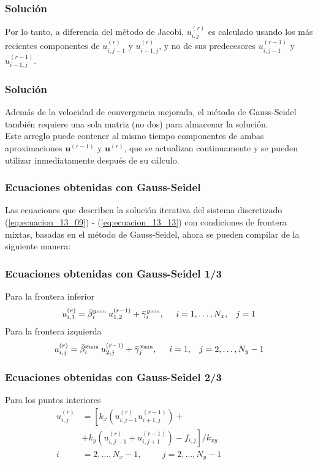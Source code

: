 \documentclass[12pt]{beamer}
\begin{document}
\begin{frame}
\frametitle{Solución}
Por lo tanto, a diferencia del método de Jacobi, $u_{i,j}^{(r)}$ es calculado usando los más recientes componentes de $u_{i,j-1}^{(r)}$ y $u_{i-1, j}^{(r)}$, y no de sus predecesores $u_{i,j-1}^{(r-1)}$ y $u_{i-1, j}^{(r-1)}$.
\end{frame}
\begin{frame}
\frametitle{Solución}
Además de la velocidad de convergencia mejorada, el método de Gauss-Seidel también requiere una sola matriz (no dos) para almacenar la solución.
\\
\bigskip
Este arreglo puede contener al mismo tiempo componentes de ambas aproximaciones $\mathbf{u}^{(r-1)}$ y $\mathbf{u}^{(r)}$, que se actualizan continuamente y se pueden utilizar inmediatamente después de su cálculo.
\end{frame}
\begin{frame}
\frametitle{Ecuaciones obtenidas con Gauss-Seidel}
Las ecuaciones que describen la solución iterativa del sistema discretizado (\ref{eq:ecuacion_13_09}) -  (\ref{eq:ecuacion_13_13}) con condiciones de frontera mixtas, basadas en el método de Gauss-Seidel, ahora se pueden compilar de la siguiente manera:
\end{frame}
\begin{frame}
\frametitle{Ecuaciones obtenidas con Gauss-Seidel 1/3}
Para la frontera inferior
\begin{equation}
u_{i, 1}^{(r)} = \bar{\beta}_{i}^{y {\text{\tiny{min}}}} \: u_{1,2}^{(r-1)} + \bar{\gamma}_{i}^{y {\text{\tiny{min}}}}, \hspace{0.5cm} i = 1, \ldots, N_{x}, \hspace{0.3cm} j = 1
\label{eq:ecuacion_13_24}
\end{equation}
\pause
Para la frontera izquierda
\begin{equation}
u_{i, j}^{(r)} = \bar{\beta}_{i}^{x {\text{\tiny{min}}}} \: u_{2, j}^{(r-1)} + \bar{\gamma}_{j}^{x {\text{\tiny{min}}}}, \hspace{0.5cm} i = 1, \hspace{0.3cm} j = 2, \ldots, N_{y} - 1
\label{eq:ecuacion_13_25}
\end{equation}
\end{frame}
\begin{frame}
\frametitle{Ecuaciones obtenidas con Gauss-Seidel 2/3}
Para los puntos interiores
\begin{equation}
\begin{aligned}
u_{i,j}^{(r)} &= \left[ k_{x} \left( u_{i, j-1}^{(r)} u_{i+1, j}^{(r-1)} \right) + \right. \\
&+ \left. k_{y} \left( u_{i, j-1}^{(r)} + u_{i, j+1}^{(r-1)} \right) - f_{i,j} \right] / k_{xy} \\
i &= 2, \ldots, N_{x} - 1, \hspace{1cm} j = 2, \ldots, N_{y} - 1 \hspace{2cm}
\end{aligned}
\label{eq:ecuacion_13_26}
\end{equation}    
\end{frame}
\end{document}
